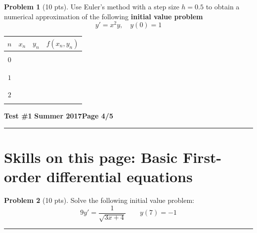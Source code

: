 \documentclass[12pt]{article}
\theoremstyle{definition}
\newtheorem{problem}{Problem}
\begin{document}
\begin{problem}[10 pts]
Use Euler's method with a step size $h=0.5$ to obtain a numerical approximation of the following \textbf{initial value problem}
\begin{equation*}
y' = x^2y, \quad y(0)=1
\end{equation*}
\vspace{5cm}
\begin{flushright}
\begin{tabular}{|c||c|c|c|}
\hline
$n$ & $x_n$ & $y_n$ & $f(x_n, y_n)$ \\ 
\hline \hline
&&& \\
$0$ & \hspace{0.5cm} & \hspace{1cm} & \hspace{3cm} \\
&&& \\ \hline
&&& \\
$1$ &&& \\
&&& \\ \hline
&&& \\
$2$ &&& \\
&&& \\ \hline
\end{tabular}
\end{flushright}
\end{problem}
\newpage


\hfill{\large\bf Test \#1}\hfill{\large\bf
Summer 2017}\hfill{\large\bf Page 4/5}\hrule

\section*{Skills on this page: Basic First-order differential equations}

\begin{problem}[10 pts]
Solve the following initial value problem:
\begin{equation*}
9y' = \frac{1}{\sqrt{3x+4}}\qquad y(7)=-1
\end{equation*}

\vspace{5cm}
\begin{flushright}
\end{flushright}
\end{problem}
\hrule
\end{document}
